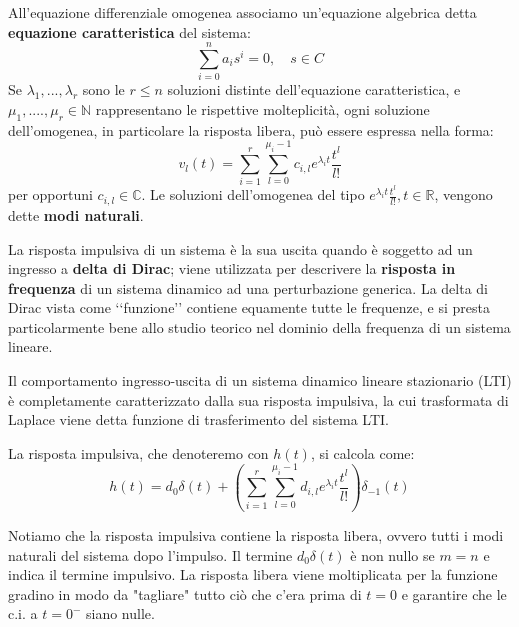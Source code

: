 \documentclass[a4paper, titlepage, oneside]{scrbook}
\begin{document}
All'equazione differenziale omogenea associamo un’equazione algebrica detta \textbf{equazione caratteristica} del sistema:
\begin{equation*}
	\sum_{i=0}^{n}a_is^i=0, \quad s \in C
\end{equation*}
Se $\lambda_1,...,\lambda_r$ sono le $r\leq n$ soluzioni distinte dell'equazione caratteristica, e $\mu_1,....,\mu_r \in \mathbb{N}$ rappresentano le rispettive molteplicità, ogni soluzione dell'omogenea, in particolare la risposta libera, può essere espressa nella forma:
\begin{equation*}
	v_l(t)=\sum_{i=1}^{r}\sum_{l=0}^{\mu_i-1}c_{i,l}e^{\lambda_it}\frac{t^l}{l!}
\end{equation*}
per opportuni $c_{i,l} \in \mathbb{C}$. Le soluzioni dell'omogenea del tipo $e^{\lambda_it}\frac{t^l}{l!}, t \in \mathbb{R}$, vengono dette \textbf{modi naturali}.

La risposta impulsiva di un sistema è la sua uscita quando è soggetto ad un ingresso a \textbf{delta di Dirac};
viene utilizzata per descrivere la \textbf{risposta in frequenza} di un sistema dinamico ad una perturbazione generica.
La delta di Dirac vista come ‘‘funzione’’ contiene equamente tutte le frequenze, e si presta particolarmente bene allo studio teorico nel dominio della frequenza di un sistema lineare.

Il comportamento ingresso-uscita di un sistema dinamico lineare stazionario (LTI) è completamente caratterizzato dalla sua risposta impulsiva, la cui trasformata di Laplace viene detta funzione di trasferimento del sistema LTI.

La risposta impulsiva, che denoteremo con $h(t)$, si calcola come:
$$ h(t)=d_0\delta(t)+\left(\sum_{i=1}^{r} \sum_{l=0}^{\mu_i-1} d_{i,l}e^{\lambda_it}\frac{t^l}{l!}\right)\delta_{-1}(t) $$

Notiamo che la risposta impulsiva contiene la risposta libera, ovvero tutti i modi naturali del sistema dopo l'impulso. Il termine $d_0\delta(t)$ è non nullo se $m=n$ e indica il termine impulsivo.
La risposta libera viene moltiplicata per la funzione gradino in modo da "tagliare" tutto ciò che c'era prima di $t=0$ e garantire che le c.i. a $t=0^-$ siano nulle.
\end{document}
